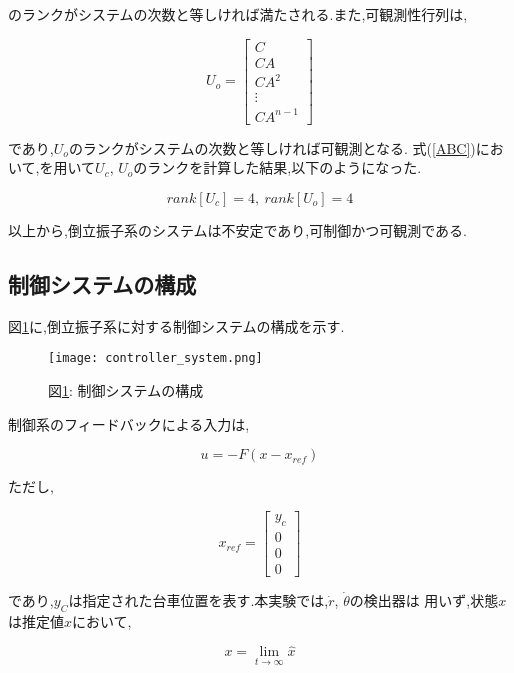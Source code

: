 のランクがシステムの次数と等しければ満たされる.また,可観測性行列は,

$$
    U_{o} = 
    \left[
        \begin{array}{c}
            C \\
            CA \\
            CA^2 \\
            \vdots \\
            CA^{n-1}
        \end{array}
    \right]
$$

であり,$U_{o}$のランクがシステムの次数と等しければ可観測となる.
式(\ref{ABC})において,\MaTX{}を用いて$U_{c}$, $U_{o}$のランクを計算した結果,以下のようになった.

$$
    rank[U_c] = 4,\ rank[U_o] = 4
$$

以上から,倒立振子系のシステムは不安定であり,可制御かつ可観測である.

\subsection{制御システムの構成}
図\ref{controller_system}に,倒立振子系に対する制御システムの構成を示す.

\begin{figure}[htbp]
    \begin{center}
        \texttt{[image: controller\_system.png]}
        \caption{図\ref{controller_system}: 制御システムの構成}
        \label{controller_system}
    \end{center}
\end{figure}

制御系のフィードバックによる入力は,

$$
    u = -F \left( x - x_{ref} \right)
$$

ただし,

$$
    x_{ref} =
    \left[
        \begin{array}{c}
            y_{c} \\
            0 \\
            0 \\
            0
        \end{array}
    \right]
$$

であり,$y_{C}$は指定された台車位置を表す.本実験では,$\dot{r}$, $\dot{\theta}$の検出器は
用いず,状態$x$は推定値$\hat{x}$において,

\begin{equation}
    x = \lim_{t \to \infty} \hat{x}
    \label{definition_x}
\end{equation}

